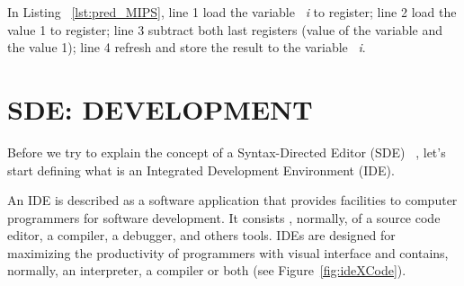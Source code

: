 \documentclass[
  oneside,
  11pt, a4paper,
  footinclude=true,
  headinclude=true,
  cleardoublepage=empty
]{scrbook}
\begin{document}
In Listing ~\ref{lst:pred_MIPS}, line 1 load the variable ~\textit{i} to register; line 2 load the value 1 to register; line 3 subtract both last registers (value of the variable and the value 1); line 4 refresh and store the result to the variable ~\textit{i}.































\chapter{SDE: DEVELOPMENT}

Before we try to explain the concept of a Syntax-Directed Editor (SDE) ~\citep{RT89b,Ko05,alsCH10a,TR81a,RMT86a,RT89a,AHW89}, let's start defining what is an Integrated Development Environment (IDE).

An IDE is described as a software application that provides facilities to computer programmers for software development. It consists , normally, of a source code editor, a compiler, a debugger, and others tools.
IDEs are designed for maximizing the productivity of programmers with visual interface and contains, normally, an interpreter, a compiler or both (see Figure~\ref{fig:ideXCode}).
\end{document}
